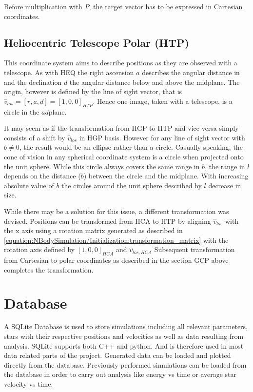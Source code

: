 \documentclass[letterpaper,10pt,english]{sphinxmanual}
\begin{document}
\sphinxAtStartPar
Before multiplication with \(P\), the target vector has to be expressed in Cartesian coordinates.


\section{Heliocentric Telescope Polar (HTP)}
\label{\detokenize{NBodySimulation/CoordinateSystems:heliocentric-telescope-polar-htp}}
\sphinxAtStartPar
This coordinate system aims to describe positions as they are observed with a telescope.
As with HEQ the right ascension \(a\) describes the angular distance in and the declination \(d\) the angular distance below and above the midplane.
The origin, however is defined by the line of sight vector, that is \(\hat{v}_{los} = [r,a,d] = [1,0,0]_{HTP}\).
Hence one image, taken with a telescope, is a circle in the \(ad\)\sphinxhyphen{}plane.

\sphinxAtStartPar
It may seem as if the transformation from HGP to HTP and vice versa simply consists of a shift by \(\hat{v}_{los}\) in HGP basis.
However for any line of sight vector with \(b\neq0\), the result would be an ellipse rather than a circle.
Casually speaking, the cone of vision in any spherical coordinate system is a circle when projected onto the unit sphere.
While this circle always covers the same range in \(b\), the range in \(l\) depends on the distance (\(b\)) between the circle and the midplane.
With increasing absolute value of \(b\) the circles around the unit sphere described by \(l\) decrease in size.

\sphinxAtStartPar
While there may be a solution for this issue, a different transformation was devised.
Positions can be transformed from HCA to HTP by aligning \(\hat{v}_{los}\) with the x axis 
using a rotation matrix generated as described in \eqref{equation:NBodySimulation/Initialization:transformation_matrix} with the rotation axis defined by \([1,0,0]_{HCA}\) and \(\hat{v}_{los,HCA}\)
Subsequent transformation from Cartesian to polar coordinates as described in the section GCP above completes the transformation.


\chapter{Database}
\label{\detokenize{NBodySimulation/Database:database}}\label{\detokenize{NBodySimulation/Database::doc}}
\sphinxAtStartPar
A SQLite Database is used to store simulations including all relevant parameters, stars with their respective positions and velocities as well as data resulting from analysis.
SQLite supports both C++ and python. And is therefore used in most data related parts of the project. Generated data can be loaded and plotted directly from the database.
Previously performed simulations can be loaded from the database in order to carry out analysis like energy vs time or average star velocity vs time.
\end{document}
